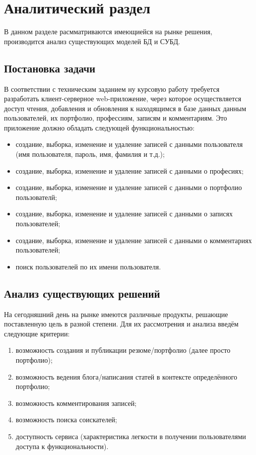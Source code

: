 \chapter{Аналитический раздел}%
\label{cha:analiticheskii_razdel}

В данном разделе расмматриваются имеющиейся на рынке решения, производится анализ существующих моделей БД и СУБД.

\section{Постановка задачи}%
\label{sec:postanovka_zadachi}

В соответствии с техническим заданием ну курсовую работу требуется разработать клиент-серверное web-приложение, через которое осуществляется доступ чтения, добавления и обновления к находящимся в базе данных данным пользователей, их портфолио, профессиям, записям и комментариям. Это приложение должно обладать следующей функциональностью:
\begin{itemize}
    \item создание, выборка, изменение и удаление записей с данными пользователя (имя пользователя, пароль, имя, фамилия и т.д.);
    \item создание, выборка, изменение и удаление записей с данными о професиях;
    \item создание, выборка, изменение и удаление записей с данными о портфолио пользователй;
    \item создание, выборка, изменение и удаление записей с данными о записях пользователей;
    \item создание, выборка, изменение и удаление записей с данными о комментариях пользователей;
    \item поиск пользователей по их имени пользователя.
\end{itemize}

\section{Анализ существующих решений}%
\label{sec:analiz_sushchestvuiushchikh_reshenii}

На сегодняшний день на рынке имеются различные продукты, решающие поставленную цель в разной степени. Для их рассмотрения и анализа введём следующие критерии:
\begin{enumerate}[label={\arabic*)}]
    \item возможность создания и публикации резюме/портфолио (далее просто портфолио);
    \item возможность ведения блога/написания статей в контексте определённого портфолио;
    \item возможность комментирования записей;
    \item возможность поиска соискателей;
    \item доступность сервиса (характеристика легкости в получении пользователями доступа к функциональности).
\end{enumerate}

